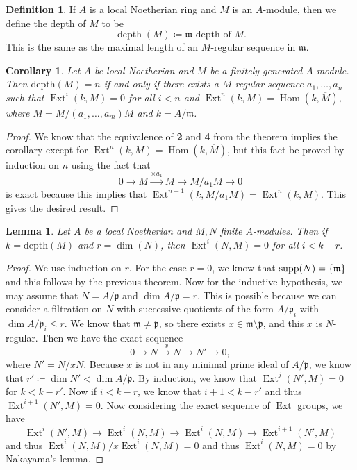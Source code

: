 \documentclass[leqno, openany]{memoir}
\newtheorem{cor}[thm]{Corollary}
\newtheorem{lem}[thm]{Lemma}
\theoremstyle{definition}
\newtheorem{defn}[thm]{Definition}
\theoremstyle{remark}
\theoremstyle{plain}
\theoremstyle{definition}
\theoremstyle{remark}
\newcommand{\mf}[1]{\mathfrak{#1}}
\newcommand{\mr}[1]{\mathrm{#1}}
\newcommand{\ol}[1]{\overline{#1}}
\DeclareMathOperator{\Hom}{Hom}
\DeclareMathOperator{\supp}{supp}
\DeclareMathOperator{\Ext}{Ext}
\begin{document}
\begin{defn} If $A$ is a local Noetherian ring and $M$ is an $A$-module, then
    we define the depth of $M$ to be \[ \operatorname{depth}(M) \coloneqq
    \mf{m}\text{-depth of }M. \] This is the same as the maximal length of an
    $M$-regular sequence in $\mf{m}$.  \end{defn}

\begin{cor} Let $A$ be local Noetherian and $M$ be a finitely-generated
    $A$-module. Then $\mr{depth}(M) = n$ if and only if there exists a
    $M$-regular sequence $a_1, \ldots, a_n$ such that $\Ext^i(k, M) = 0$ for
    all $i < n$ and $\Ext^n(k,M) = \Hom(k,\ol{M})$, where $\ol{M} = M/(a_1,
    \ldots, a_m)M$ and $k = A/\mf{m}$.  \end{cor}

\begin{proof} We know that the equivalence of \textbf{2} and \textbf{4} from
    the theorem implies the corollary except for $\Ext^n(k,M) = \Hom(k,
    \ol{M})$, but this fact be proved by induction on $n$ using the fact that
    \[ 0 \to M \xrightarrow{\times a_1} M \to M/a_1 M \to 0 \] is exact because
this implies that $\Ext^{n-1}(k, M/a_1 M) = \Ext^n(k,M)$. This gives the
desired result.  \end{proof}

\begin{lem} Let $A$ be a local Noetherian and $M,N$ finite $A$-modules. Then if
$k = \mr{depth}(M)$ and $r = \dim(N)$, then $\Ext^i(N,M) = 0$ for all $i <
k-r$.  \end{lem}

\begin{proof} We use induction on $r$. For the case $r = 0$, we know that
    $\supp(N) = \qty{\mf{m}}$ and this follows by the previous theorem. Now for
    the inductive hypothesis, we may assume that $N = A/\mf{p}$ and $\dim
    A/\mf{p} = r$. This is possible because we can consider a filtration on $N$
    with successive quotients of the form $A/\mf{p}_i$ with $\dim A/\mf{p}_i
    \leq r$. We know that $\mf{m} \neq \mf{p}$, so there exists $x \in \mf{m}
    \setminus \mf{p}$, and this $x$ is $N$-regular. Then we have the exact
    sequence \[ 0 \to N \xrightarrow{\cdot x} N \to N' \to 0, \] where $N' =
    N/xN$. Because $\ol{x}$ is not in any minimal prime ideal of $A/\mf{p}$, we
    know that $r' \coloneqq \dim N' < \dim A/\mf{p}$. By induction, we know
    that $\Ext^j(N',M) = 0$ for $k < k-r'$. Now if $i < k-r$, we know that $i+1
    < k-r'$ and thus $\Ext^{i+1}(N',M) = 0$. Now considering the exact sequence
    of $\Ext$ groups, we have \[ \Ext^i(N',M) \to \Ext^i(N,M) \to \Ext^i(N,M)
    \to \Ext^{i+1}(N',M) \] and thus $\Ext^i(N,M) / x \Ext^i(N,M) = 0$ and thus
$\Ext^i(N,M) = 0$ by Nakayama's lemma.  \end{proof}
\end{document}
